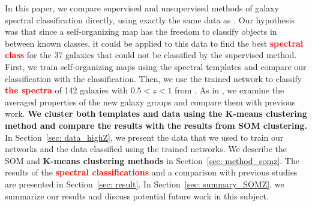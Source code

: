 In this paper, we compare supervised and unsupervised methods of galaxy spectral classification directly, using exactly the same data as .  
Our hypothesis was that since a self-organizing map has the freedom to classify objects in between known classes, it could be applied to this data 
to find the best \textbf{\textcolor{red}{spectral class}} for the 37 galaxies that could not be classified by the supervised method.
First, we train self-organizing maps using the  spectral templates and compare our classification with the  classification.
Then, we use the trained network to classify \textbf{\textcolor{red}{the spectra}} of 142 galaxies with $0.5 < z < 1$ from . 
As in , we examine the averaged properties of the new galaxy groups and compare them with previous work.
\textbf{We cluster both  templates and  data using the K-means clustering method and compare the results with the results from SOM clustering.}
In Section~\ref{sec: data_highZ}, we present the data that we used to train our networks and the data classified using the trained networks. 
We describe the SOM and \textbf{K-means clustering methods} in Section~\ref{sec: method_somz}. 
The results of the \textbf{\textcolor{red}{spectral classifications}} and a comparison with previous studies are presented in Section~\ref{sec: result}. 
In Section~\ref{sec: summary_SOMZ}, we summarize our results and discuss potential future work in this subject.